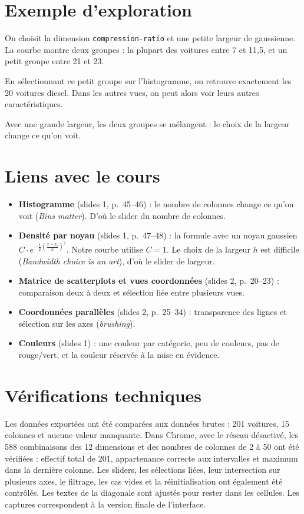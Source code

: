 \documentclass[11pt,a4paper]{article}
\newcommand{\code}[1]{\texttt{#1}}
\begin{document}
\section{Exemple d'exploration}

On choisit la dimension \code{compression-ratio} et une petite largeur de gaussienne. La courbe montre deux groupes : la plupart des voitures entre 7 et 11,5, et un petit groupe entre 21 et 23.

En sélectionnant ce petit groupe sur l'histogramme, on retrouve exactement les 20 voitures diesel. Dans les autres vues, on peut alors voir leurs autres caractéristiques.

Avec une grande largeur, les deux groupes se mélangent : le choix de la largeur change ce qu'on voit.

\section{Liens avec le cours}

\begin{itemize}
  \item \textbf{Histogramme} (slides 1, p.~45--46) : le nombre de colonnes change ce qu'on voit (\textit{Bins matter}). D'où le slider du nombre de colonnes.
  \item \textbf{Densité par noyau} (slides 1, p.~47--48) : la formule avec un noyau gaussien $C \cdot e^{-\frac{1}{2}\left(\frac{x - x_i}{h}\right)^2}$. Notre courbe utilise $C = 1$. Le choix de la largeur $h$ est difficile (\textit{Bandwidth choice is an art}), d'où le slider de largeur.
  \item \textbf{Matrice de scatterplots et vues coordonnées} (slides 2, p.~20--23) : comparaison deux à deux et sélection liée entre plusieurs vues.
  \item \textbf{Coordonnées parallèles} (slides 2, p.~25--34) : transparence des lignes et sélection sur les axes (\textit{brushing}).
  \item \textbf{Couleurs} (slides 1) : une couleur par catégorie, peu de couleurs, pas de rouge/vert, et la couleur réservée à la mise en évidence.
\end{itemize}

\section{Vérifications techniques}

Les données exportées ont été comparées aux données brutes : 201 voitures, 15 colonnes et aucune valeur manquante. Dans Chrome, avec le réseau désactivé, les 588 combinaisons des 12 dimensions et des nombres de colonnes de 2 à 50 ont été vérifiées : effectif total de 201, appartenance correcte aux intervalles et maximum dans la dernière colonne. Les sliders, les sélections liées, leur intersection sur plusieurs axes, le filtrage, les cas vides et la réinitialisation ont également été contrôlés. Les textes de la diagonale sont ajustés pour rester dans les cellules. Les captures correspondent à la version finale de l'interface.
\end{document}
